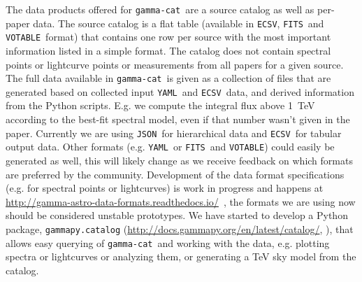 \documentclass[11pt,twoside]{article}
\newcommand{\gammacat}{\texttt{gamma-cat}}
\newcommand{\yaml}{\texttt{YAML}}
\newcommand{\ecsv}{\texttt{ECSV}}
\newcommand{\fits}{\texttt{FITS}}
\newcommand{\votable}{\texttt{VOTABLE}}
\newcommand{\json}{\texttt{JSON}}
\newcommand{\desylc}{\url{https://astro.desy.de/gamma_astronomy/magic/projects/light_curve_archive/}}
\newcommand{\gadfurl}{\url{http://gamma-astro-data-formats.readthedocs.io/}}
\newcommand{\gammapycat}{\url{http://docs.gammapy.org/en/latest/catalog/}}
\begin{document}
The data products offered for \gammacat\ are a source catalog as well as
per-paper data. The source catalog is a flat table (available in \ecsv, \fits\
and \votable\ format) that contains one row per source with the most important
information listed in a simple format. The catalog does not contain spectral
points or lightcurve points or measurements from all papers for a given source.
The full data available in \gammacat\ is given as a collection of files that are
generated based on collected input \yaml\ and \ecsv\ data, and derived
information from the Python scripts. E.g. we compute the integral flux above
1~TeV according to the best-fit spectral model, even if that number wasn't given
in the paper. Currently we are using \json\ for hierarchical data and \ecsv\ for
tabular output data. Other formats (e.g. \yaml\ or \fits\ and \votable) could
easily be generated as well, this will likely change as we receive feedback on
which formats are preferred by the community. Development of the data format
specifications (e.g. for spectral points or lightcurves) is work in progress and
happens at \gadfurl\ \citep{open-gamma}, the formats we are using now should be
considered unstable prototypes. We have started to develop a Python package,
\texttt{gammapy.catalog} (\gammapycat, \citet{gammapy}), that allows easy
querying of \gammacat\ and working with the data, e.g. plotting spectra or
lightcurves or analyzing them, or generating a TeV sky model from the catalog.



% 
% 
% 

% 
\end{document}
